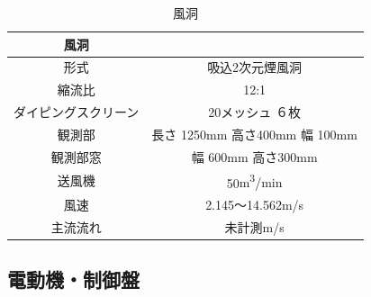 \documentclass[a4paper,titlepage]{ltjsarticle}
\begin{document}
\begin{table}[hbtp]
  \caption{風洞}
  \centering
  \begin{tabular}{cc}
    \toprule
    風洞&\\
    \hline
    形式 & 吸込2次元煙風洞\\
    
    縮流比 & 12:1\\
    
    ダイピングスクリーン & 20メッシュ ６枚\\
    
    観測部 & 長さ 1250mm 高さ400mm 幅 100mm\\
    
    観測部窓 & 幅 600mm 高さ300mm\\
    
    送風機 & 50{\si{m^3/min}}\\
    
    風速 & 2.145～14.562{\si{m/s}}\\
    
主流流れ & 未計測{\si{m/s}}\\
\bottomrule
  \end{tabular}
\end{table}

\clearpage

\subsection{電動機・制御盤}
\end{document}

